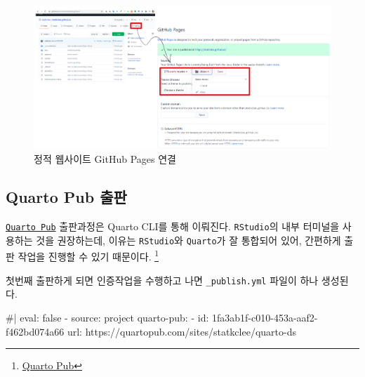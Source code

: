 \documentclass[
  letterpaper,
]{book}
\newenvironment{Shaded}{\begin{snugshade}}{\end{snugshade}}
\newcommand{\NormalTok}[1]{\textcolor[rgb]{0.00,0.23,0.31}{#1}}
\begin{document}
\begin{figure}

{\centering \includegraphics{images/tutorial_website_pages.png}

}

\caption{정적 웹사이트 GitHub Pages 연결}

\end{figure}

\hypertarget{quarto-pub-uxcd9cuxd310}{%
\subsection{Quarto Pub 출판}\label{quarto-pub-uxcd9cuxd310}}

\href{https://quartopub.com/}{\texttt{Quarto\ Pub}} 출판과정은 Quarto
CLI를 통해 이뤄진다. \texttt{RStudio}의 내부 터미널을 사용하는 것을
권장하는데, 이유는 \texttt{RStudio}와 \texttt{Quarto}가 잘 통합되어
있어, 간편하게 출판 작업을 진행할 수 있기 때문이다. \footnote{\href{https://quarto.org/docs/publishing/quarto-pub.html}{Quarto
  Pub}}

\begin{Shaded}
\end{Shaded}

첫번째 출판하게 되면 인증작업을 수행하고 나면 \texttt{\_publish.yml}
파일이 하나 생성된다.

\begin{Shaded}
\begin{Highlighting}[]
\NormalTok{\#| eval: false}
\NormalTok{{-} source: project}
\NormalTok{  quarto{-}pub:}
\NormalTok{    {-} id: 1fa3ab1f{-}c010{-}453a{-}aaf2{-}f462bd074a66}
\NormalTok{      url: \textquotesingle{}https://quartopub.com/sites/statkclee/quarto{-}ds\textquotesingle{}}
\end{Highlighting}
\end{Shaded}
\end{document}
